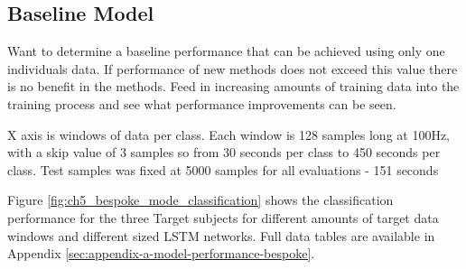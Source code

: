 \subsection{Baseline Model}
\label{subsec:ch5-baseline-model-results}
Want to determine a baseline performance that can be achieved using only one individuals data. If performance of new methods does not exceed this value there is no benefit in the methods. Feed in increasing amounts of training data into the training process and see what performance improvements can be seen.

X axis is windows of data per class. Each window is 128 samples long at 100Hz, with a skip value of 3 samples so from 30 seconds per class to 450 seconds per class. Test samples was fixed at 5000 samples for all evaluations - 151 seconds

Figure \ref{fig:ch5_bespoke_mode_classification} shows the classification performance for the three Target subjects for different amounts of target data windows and different sized LSTM networks. Full data tables are available in Appendix \ref{sec:appendix-a-model-performance-bespoke}.

